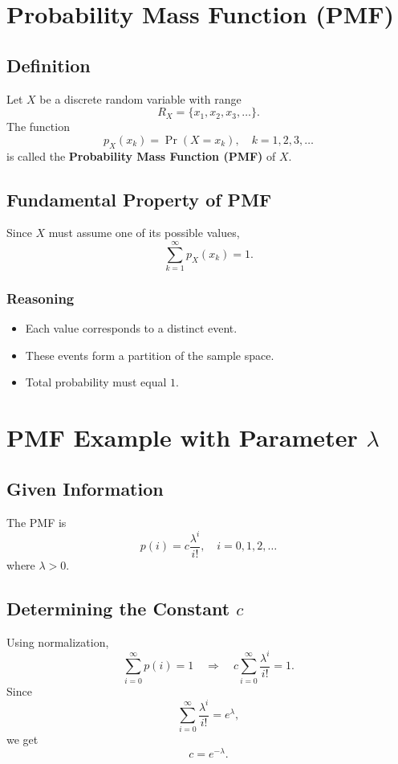\documentclass[11pt]{article}
\begin{document}
\section{Probability Mass Function (PMF)}

\subsection{Definition}

Let $X$ be a discrete random variable with range
\[
R_X=\{x_1,x_2,x_3,\ldots\}.
\]
The function
\[
p_X(x_k)=\Pr(X=x_k), \quad k=1,2,3,\ldots
\]
is called the \textbf{Probability Mass Function (PMF)} of $X$.

\subsection{Fundamental Property of PMF}

Since $X$ must assume one of its possible values,
\[
\sum_{k=1}^{\infty} p_X(x_k)=1.
\]

\subsubsection*{Reasoning}
\begin{itemize}
    \item Each value corresponds to a distinct event.
    \item These events form a partition of the sample space.
    \item Total probability must equal $1$.
\end{itemize}

\section{PMF Example with Parameter $\lambda$}

\subsection{Given Information}

The PMF is
\[
p(i)=c\frac{\lambda^i}{i!}, \quad i=0,1,2,\ldots
\]
where $\lambda>0$.

\subsection{Determining the Constant $c$}

Using normalization,
\[
\sum_{i=0}^{\infty} p(i)=1
\quad\Rightarrow\quad
c\sum_{i=0}^{\infty}\frac{\lambda^i}{i!}=1.
\]
Since
\[
\sum_{i=0}^{\infty}\frac{\lambda^i}{i!}=e^{\lambda},
\]
we get
\[
c=e^{-\lambda}.
\]
\end{document}
